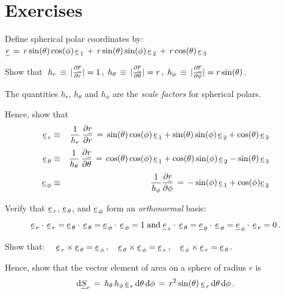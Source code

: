 \section{Exercises}
\begin{ExerciseList}
  \Exercise Define spherical polar coordinates by:
  \(
  \v{r}
  \,=\,
  r\sin(\theta)\cos(\phi)\,\eone
  \,+\,
  r\sin(\theta)\sin(\phi)\,\etwo
  \,+\,
  r\cos(\theta)\,\ethree
  \)

  \Question Show that
  \(
  \;
  h_r
  \,\equiv\,
  | \parpar{\vr}{r}|
  = 1
  \,,\;
  h_\theta
  \,\equiv\,
  | \parpar{\vr}{\theta}|
  = r
  \,,\;
  h_\phi
  \,\equiv\,
  | \parpar{\vr}{\phi} |
  =
  r\sin(\theta)  \,.
  \)

  The quantities $h_r$, $h_\theta$ and $h_\phi$ are the \emph{scale factors} for spherical
  polars.

  \Question Hence, show that
  \begin{eqnarray*}
    \er
    &\equiv&
    \frac{1}{h_r} \: \parpar{\vr}{r}
    \,=\,
    \sin(\theta)\cos(\phi) \, \eone +
    \sin(\theta)\sin(\phi) \, \etwo +
    \cos(\theta) \, \ethree \\[0.5ex]
    \etheta
    &\equiv&
    \frac{1}{h_\theta} \: \parpar{\vr}{\theta}
    \,=\,
    \cos(\theta)\cos(\phi) \, \eone +
    \cos(\theta)\sin(\phi) \, \etwo -
    \sin(\theta) \, \ethree \\[0.5ex]
    \ephi
    &\equiv&
    \frac{1}{h_\phi}\parpar{\vr}{\phi}
    \,=\,
    -\sin(\phi) \, \eone + \cos(\phi)\etwo
  \end{eqnarray*}

  \Question Verify that $\mbox{$\underline{\mbox{$e$}}_{{\,r}}$}$, $\mbox{$\underline{\mbox{$e$}}_{{\,\theta}}$}$, and $\mbox{$\underline{\mbox{$e$}}_{{\,\phi}}$}$ form an
  \emph{orthonormal} basis:
  \[
    \er \cdot \,\er = \etheta \cdot \,\etheta = \ephi \cdot \,\ephi = 1
    \;\mbox{and}\;
    \v{e}_{\,r} \cdot \,\etheta = \v{e}_{\,\theta} \cdot \,\ephi
    = \v{e}_{\,\phi} \cdot \,\er = 0 \,.
  \]

  \Question Show that:
  \(
  \quad
  \mbox{$\underline{\mbox{$e$}}_{{\,r}}$} \times \mbox{$\underline{\mbox{$e$}}_{{\,\theta}}$} = \mbox{$\underline{\mbox{$e$}}_{{\,\phi}}$} \,,
  \quad
  \mbox{$\underline{\mbox{$e$}}_{{\,\theta}}$} \times \mbox{$\underline{\mbox{$e$}}_{{\,\phi}}$} = \mbox{$\underline{\mbox{$e$}}_{{\,r}}$} \,,
  \quad
  \mbox{$\underline{\mbox{$e$}}_{{\,\phi}}$} \times \mbox{$\underline{\mbox{$e$}}_{{\,r}}$} = \mbox{$\underline{\mbox{$e$}}_{{\,\theta}}$} \,.
  \)

  \Question Hence, show that the vector element of area on a sphere of radius
  $r$ is
  \[
    {\rm d}\v{S}_r
    \,=\,
    h_\theta \, h_\phi \, \er \, {\rm d}\theta \, {\rm d}\phi
    \,=\,
    r^2\sin(\theta) \: \er \, {\rm d}\theta \, {\rm d}\phi \,.
  \]


\end{ExerciseList}

